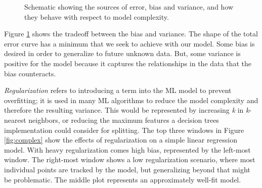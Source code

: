 \begin{figure}[!htb]
  \caption{Schematic showing the sources of error, bias and variance, and how 
           they behave with respect to model complexity.}
  \label{fig:bvtradeoff}
\end{figure}

Figure \ref{fig:bvtradeoff} shows the tradeoff between the bias and variance.
The shape of the total error curve has a minimum that we seek to achieve with
our model. Some bias is desired in order to generalize to future unknown data.
But, some variance is positive for the model because it captures the
relationships in the data that the bias counteracts. 

\textit{Regularization} refers to introducing a term into the \gls{ML} model to
prevent overfitting; it is used in many \gls{ML} algorithms to reduce the model
complexity and therefore the resulting variance.  This would be represented by
increasing \textit{k} in \textit{k}-nearest neighbors, or reducing the maximum
features a decision trees implementation could consider for splitting.  The top
three windows in Figure \ref{fig:complex} show the effects of regularization on
a simple linear regression model. With heavy regularization comes high bias,
represented by the left-most window.  The right-most window shows a low
regularization scenario, where most individual points are tracked by the model,
but generalizing beyond that might be problematic. The middle plot represents an 
approximately well-fit model.  

